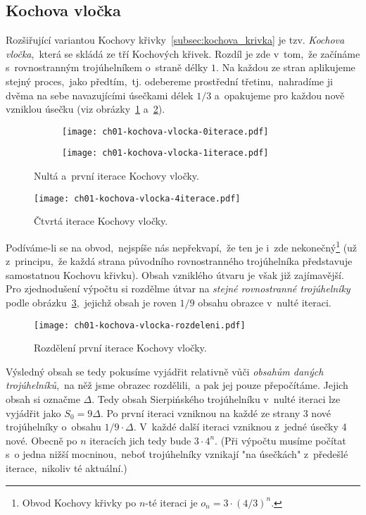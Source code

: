 \subsection{Kochova vločka}\label{subsec:kochova_vlocka}
Rozšiřující variantou Kochovy křivky~\ref{subsec:kochova_krivka} je tzv. \emph{Kochova vločka},~která se skládá ze tří Kochových křivek. Rozdíl je zde v~tom,~že začínáme s~rovnostranným trojúhelníkem o~straně délky $1$. Na každou ze stran aplikujeme stejný proces,~jako předtím,~tj. odebereme prostřední třetinu,~nahradíme ji dvěma na sebe navazujícími úsečkami délek $1/3$ a~opakujeme pro každou nově vzniklou úsečku (viz obrázky~\ref{fig:kochova_vlocka_dve_iterace} a~\ref{fig:kochova_krivka_5iterace}).
\begin{figure}[h]
    \centering
    \begin{subfigure}{\subfigwidth}
        \centering
        \texttt{[image: ch01-kochova-vlocka-0iterace.pdf]}
    \end{subfigure}
    \qquad
    \begin{subfigure}{\subfigwidth}
        \centering
        \texttt{[image: ch01-kochova-vlocka-1iterace.pdf]}
    \end{subfigure}
    \caption{Nultá a~první iterace Kochovy vločky.}
    \label{fig:kochova_vlocka_dve_iterace}
\end{figure}
\begin{figure}[h]
    \centering
    \texttt{[image: ch01-kochova-vlocka-4iterace.pdf]}
    \caption{Čtvrtá iterace Kochovy vločky.}
    \label{fig:kochova_krivka_5iterace}
\end{figure}
Podíváme-li se na obvod,~nejspíše nás nepřekvapí,~že ten je i~zde nekonečný\footnote{Obvod Kochovy křivky po $n$-té iteraci je $o_n=3\cdot(4/3)^{n}$.} (už z~principu,~že každá strana původního rovnostranného trojúhelníka představuje samostatnou Kochovu křivku).
Obsah vzniklého útvaru je však již zajímavější. Pro zjednodušení výpočtu si rozdělme útvar na \emph{stejné rovnostranné trojúhelníky} podle obrázku~\ref{fig:kochova_vlocka_rozdeleni},~jejichž obsah je roven $1/9$ obsahu obrazce v~nulté iteraci.
\begin{figure}[h]
    \centering
    \texttt{[image: ch01-kochova-vlocka-rozdeleni.pdf]}
    \caption{Rozdělení první iterace Kochovy vločky.}
    \label{fig:kochova_vlocka_rozdeleni}
\end{figure}
Výsledný obsah se tedy pokusíme vyjádřit relativně vůči \emph{obsahům daných trojúhelníků},~na něž jsme obrazec rozdělili,~a pak jej pouze přepočítáme. Jejich obsah si označme $\Delta$. Tedy obsah Sierpińského trojúhelníku v~nulté iteraci lze vyjádřit jako $S_0=9\Delta$. Po první iteraci vzniknou na každé ze strany 3 nové trojúhelníky o~obsahu $1/9\cdot\Delta$. V~každé další iteraci vzniknou z~jedné úsečky 4 nové. Obecně po $n$ iteracích jich tedy bude $3\cdot 4^{n}$. (Při výpočtu musíme počítat s~o jedna nižší mocninou,~neboť trojúhelníky vznikají "na úsečkách" z~předešlé iterace,~nikoliv té aktuální.)\par
